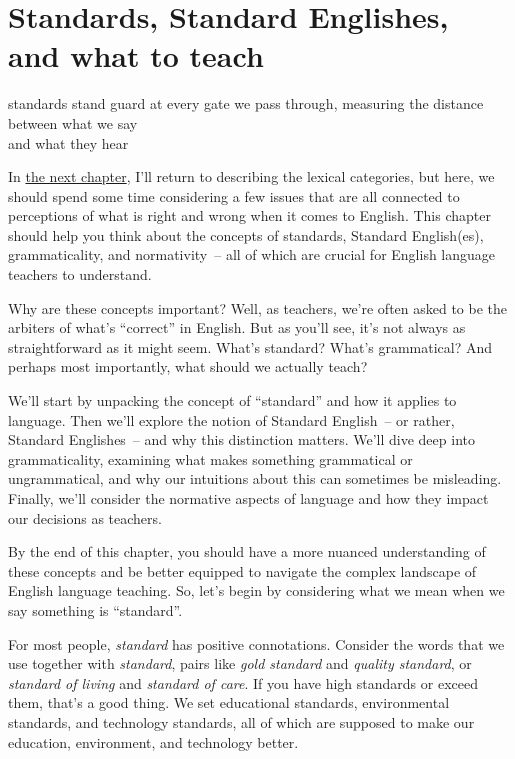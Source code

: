 \chapter{Standards, Standard Englishes,\\and what to teach}\label{sec:standards}\label{ch:standards}

\epigraph{standards stand guard
at every gate we pass through,
measuring the distance 
between what we say\\\phantom{~}\hfill
and what they hear}{}

In \hyperref[ch:categories]{the next chapter}, I'll return to describing the lexical categories, but here, we should spend some time considering a few issues that are all connected to perceptions of what is right and wrong when it comes to English. This chapter should help you think about the concepts of standards, Standard English(es), grammaticality, and normativity~-- all of which are crucial for English language teachers to understand.

Why are these concepts important? Well, as teachers, we're often asked to be the arbiters of what's ``correct'' in English. But as you'll see, it's not always as straightforward as it might seem. What's standard? What's grammatical? And perhaps most importantly, what should we actually teach?

We'll start by unpacking the concept of ``standard'' and how it applies to language. Then we'll explore the notion of Standard English~-- or rather, Standard Englishes~-- and why this distinction matters. We'll dive deep into grammaticality, examining what makes something grammatical or ungrammatical, and why our intuitions about this can sometimes be misleading. Finally, we'll consider the normative aspects of language and how they impact our decisions as teachers.

By the end of this chapter, you should have a more nuanced understanding of these concepts and be better equipped to navigate the complex landscape of English language teaching. So, let's begin by considering what we mean when we say something is ``standard''.

For most people, \textit{standard} has positive connotations. Consider the words that we use together with \textit{standard}, pairs like \textit{gold standard} and \textit{quality standard},  or \textit{standard of living} and \textit{standard of care}. If you have high standards or exceed them, that's a good thing. We set educational standards, environmental standards, and technology standards, all of which are supposed to make our education, environment, and technology better.


